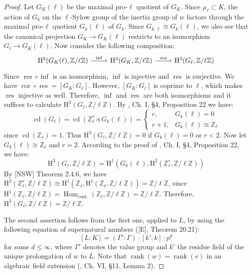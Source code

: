 \begin{proof}
Let $G_K(\ell)$ be the maximal pro-$\ell$ quotient of $G_K$. Since $\mu_\ell\subset K$, the action of $G_k$ on the $\ell$-Sylow group of the inertia group of $w$ factors through the maximal pro-$\ell$ quotient $G_k(\ell)$ of $G_k$. Since $G_{k,\ell}\cong G_k(\ell)$, we also see that the canonical projection $G_K\to G_K(\ell)$ restricts to an isomorphism $G_\ell\to G_K(\ell)$. Now consider the following composition:
\[ \begin{tikzcd}
\mathrm{H}^3(G_K(\ell),\mathbb{Z}/\ell\mathbb{Z}) \ar[r, "\operatorname{inf}"] & \mathrm{H}^3(G_K,\mathbb{Z}/\ell\mathbb{Z}) \ar[r, "\operatorname{res}"] & \mathrm{H}^3(G_\ell,\mathbb{Z}/\ell\mathbb{Z})
\end{tikzcd} \]
Since $\operatorname{res}\circ\operatorname{inf}$ is an isomorphism, $\operatorname{inf}$ is injective and $\operatorname{res}$ is surjective. We have $\operatorname{cor}\circ\operatorname{res} = [G_K:G_\ell]$. However, $[G_K:G_\ell]$ is coprime to $\ell$, which makes $\operatorname{res}$ injective as well. Therefore, $\operatorname{inf}$ and $\operatorname{res}$ are both isomorphisms and it suffices to calculate $\mathrm{H}^3(G_\ell,\mathbb{Z}/\ell\mathbb{Z})$. By \cite{Se64}, Ch. I, §4, Proposition 22 we have:
\[\operatorname{cd}(G_\ell) = \operatorname{cd}(\mathbb{Z}_\ell^r\rtimes G_k(\ell)) = \begin{cases}
r, & G_k(\ell) = 0 \\
r + 1, & G_k(\ell)\cong\mathbb{Z}_\ell
\end{cases} \] 
since $\operatorname{cd}(\mathbb{Z}_\ell)=1$. Thus $\mathrm{H}^3(G_\ell, \mathbb{Z}/\ell\mathbb{Z}) =0$ if $G_k(\ell) = 0$ or $r < 2$. Now let $G_k(\ell) \cong\mathbb{Z}_\ell$ and $r = 2$. According to the proof of \cite{Se64}, Ch. I, §4, Proposition 22, we have:
\[ \mathrm{H}^3(G_\ell,\mathbb{Z}/\ell\mathbb{Z}) = \mathrm{H}^1(G_k(\ell), \mathrm{H}^2 (\mathbb{Z}_\ell^r, \mathbb{Z}/\ell\mathbb{Z})) \]
By [NSW] Theorem 2.4.6, we have $\mathrm{H}^2(\mathbb{Z}_\ell^r,\mathbb{Z}/\ell\mathbb{Z}) \cong\mathrm{H}^1(\mathbb{Z}_\ell, \mathrm{H}^1(\mathbb{Z}_\ell, \mathbb{Z}/\ell\mathbb{Z})) = \mathbb{Z}/\ell\mathbb{Z}$, since $\mathrm{H}^1(\mathbb{Z}_\ell, \mathbb{Z}/\ell\mathbb{Z})=\operatorname{Hom}_\text{cont.}(\mathbb{Z}_\ell, \mathbb{Z}/\ell\mathbb{Z})=\mathbb{Z}/\ell\mathbb{Z}$. Therefore, $\mathrm{H}^3(G_\ell,\mathbb{Z}/\ell\mathbb{Z})=\mathbb{Z}/\ell\mathbb{Z}$.

The second assertion follows from the first one, applied to $L$, by using the following equation of supernatural numbers ([E], Theorem 20.21):
\[ [L:K] = (\Gamma':\Gamma) \cdot [k':k]\cdot p^d \]
for some $d \leq \infty$, where $\Gamma'$ denotes the value group and $k'$ the residue field of the unique prolongation of $w$ to $L$. Note that $\operatorname{rank}(w) = \operatorname{rank}(v)$ in an algebraic field extension (\cite{ZS60}, Ch. VI, §11, Lemma 2).
\end{proof}

